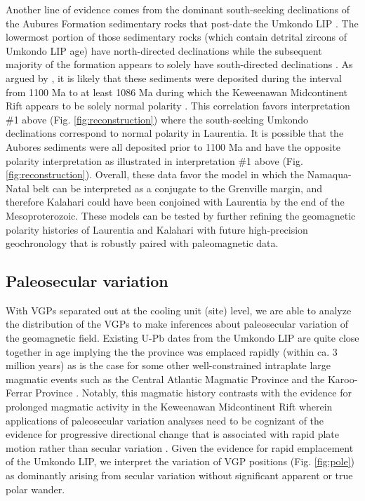 \documentclass[11pt,letterpaper]{article}
\begin{document}
Another line of evidence comes from the dominant south-seeking declinations of the Aubures Formation sedimentary rocks that post-date the Umkondo LIP \citep{Kasbohm2015a}. The lowermost portion of those sedimentary rocks (which contain detrital zircons of Umkondo LIP age) have north-directed declinations while the subsequent majority of the formation appears to solely have south-directed declinations \citep{Kasbohm2015a}. As argued by \cite{Kasbohm2015a}, it is likely that these sediments were deposited during the interval from 1100 Ma to at least 1086 Ma during which the Keweenawan Midcontinent Rift appears to be solely normal polarity \citep{Swanson-Hysell2014a}. This correlation favors interpretation $\#$1 above (Fig. \ref{fig:reconstruction}) where the south-seeking Umkondo declinations correspond to normal polarity in Laurentia. It is possible that the Aubores sediments were all deposited prior to 1100 Ma and have the opposite polarity interpretation as illustrated in interpretation $\#$1 above (Fig. \ref{fig:reconstruction}). Overall, these data favor the model in which the Namaqua-Natal belt can be interpreted as a conjugate to the Grenville margin, and therefore Kalahari could have been conjoined with Laurentia by the end of the Mesoproterozoic. These models can be tested by further refining the geomagnetic polarity histories of Laurentia and Kalahari with future high-precision geochronology that is robustly paired with paleomagnetic data. 

\subsection*{Paleosecular variation}

With VGPs separated out at the cooling unit (site) level, we are able to analyze the distribution of the VGPs to make inferences about paleosecular variation of the geomagnetic field. Existing U-Pb dates from the Umkondo LIP are quite close together in age implying the the province was emplaced rapidly (within ca. 3 million years) as is the case for some other well-constrained intraplate large magmatic events such as the Central Atlantic Magmatic Province \citep{Blackburn2013a} and the Karoo-Ferrar Province \citep{Sell2014a, Burgess2015a}. Notably, this magmatic history contrasts with the evidence for prolonged magmatic activity in the Keweenawan Midcontinent Rift wherein applications of paleosecular variation analyses need to be cognizant of the evidence for progressive directional change that is associated with rapid plate motion rather than secular variation \citep{Davis1997a, Swanson-Hysell2009a, Swanson-Hysell2014a}. Given the evidence for rapid emplacement of the Umkondo LIP, we interpret the variation of VGP positions (Fig. \ref{fig:pole}) as dominantly arising from secular variation without significant apparent or true polar wander. 
\end{document}
